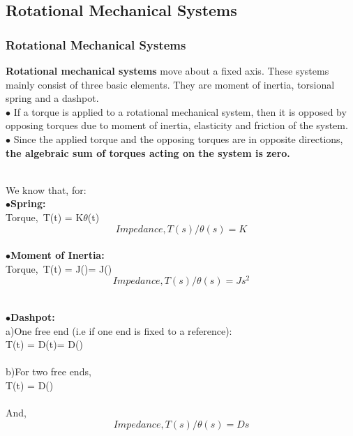 \documentclass{beamer}
\theoremstyle{remark}
\numberwithin{equation}{section}
\begin{document}
\subsection{Rotational Mechanical Systems}
\begin{frame}
\frametitle{Rotational Mechanical Systems}
{\textbf{Rotational mechanical systems}} move about a fixed axis. These systems mainly consist of three basic elements. They are moment of inertia, torsional spring and a dashpot.
\\$\bullet$ If a torque is applied to a rotational mechanical system, then it is opposed by opposing torques due to moment of inertia, elasticity and friction of the system. 
\\ $\bullet$ Since the applied torque and the opposing torques are in opposite directions, \textbf{the algebraic sum of torques acting on the system is zero.}

\end{frame}
\begin{frame}
\\ We know that, for:
\\$\bullet${\textbf{Spring:}} \\ 
Torque,\ T(t) = K{$\theta$}(t)
\begin{equation}
  Impedance, T(s)/{\theta}(s) = K
\end{equation} 
\\$\bullet${\textbf{Moment of Inertia:}} \\
Torque,\ T(t) = J()=  J()\\
\begin{equation}
  Impedance, T(s)/{\theta}(s) = Js^2
\end{equation} 
\end{frame}
\begin{frame}
\\$\bullet${\textbf{Dashpot:}} 
\\a)One free end (i.e if one end is fixed to a reference):\\
T(t) = D{\omega}(t)=  D()\\
\\b)For two free ends,
\\  T(t) = D()\\ 

\\And,
\begin{equation}
   Impedance, T(s)/{\theta}(s) = Ds
\end{equation} 
\end{frame}
\end{document}
